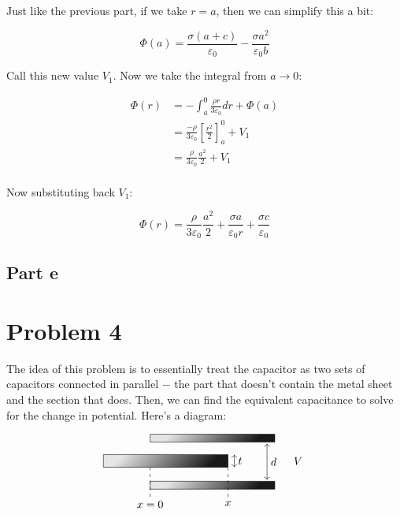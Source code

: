 \documentclass{article}
\theoremstyle{definition}
\numberwithin{equation}{section}
\numberwithin{definition}{section}
\begin{document}
    Just like the previous part, if we take $r = a$, then we can simplify this a bit:

    \[ \Phi(a) = \frac{\sigma (a+c)}{\varepsilon_0} - \frac{\sigma a^2}{\varepsilon_0b} \]

    Call this new value $V_1$. Now we take the integral from $a \to 0$: 

    \begin{align*}
        \Phi(r) &= -\int_a^0 \frac{\rho r}{3\varepsilon_0} dr + \Phi(a)\\
        &= \frac{-\rho}{3\varepsilon_0}\left[\frac{r^2}{2}\right]_a^0 + V_1\\
        &= \frac{\rho}{3\varepsilon_0} \frac{a^2}{2} + V_1\\
    \end{align*}

    Now substituting back $V_1$:

    \[ \Phi(r) = \frac{\rho}{3\varepsilon_0} \frac{a^2}{2} + \frac{\sigma a}{\varepsilon_0 r} + \frac{\sigma c}{\varepsilon_0}\]


    \subsection{Part e}


    \section{Problem 4}

    The idea of this problem is to essentially treat the capacitor as two sets of capacitors connected in parallel $-$ the part that doesn't contain the metal sheet and the section that does. Then, we can find the equivalent capacitance to solve for the change in potential. Here's a diagram:

    \[\begin{tikzpicture}
        \draw[black, shading=axis, right color=black!90, left color=black!10!white, shading angle=45, anchor=east, fill opacity=1] (1,1) -- (1,1.25) -- (-3,1.25) -- (-3,1) -- cycle;
        \draw[black, shading=axis, right color=black!90, left color=black!10!white, shading angle=45, anchor=east, fill opacity=1] (-0.5,0.6) -- (-0.5,0.2) -- (-4.5,0.2) -- (-4.5,0.6) -- cycle;
        \draw[black, shading=axis, right color=black!90, left color=black!10!white, shading angle=45, anchor=east, fill opacity=1] (1,-0.25) -- (1,-0.5) -- (-3,-0.5) -- (-3,-0.25) -- cycle;
        \draw[<->] (0.75,0.95) -- (0.75,-0.2) node[midway, right] {$d$};
        \draw[<->] (-0.3,0.6) -- (-0.3,0.2) node[midway, right] {$t$};
        \draw[dashed] (-0.5,0.2) -- (-0.5,-0.75) node[anchor=north] {$x$};
        \draw[dashed] (-3,0.2) -- (-3,-0.75) node[anchor=north] {$x = 0$};
        \node at (1.75,0.4) (v) {$V$};
\end{tikzpicture}\]
\end{document}
